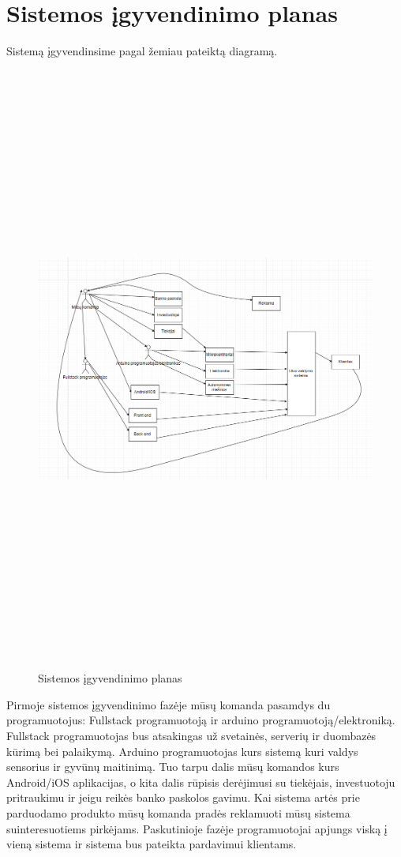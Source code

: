 \documentclass[oneside]{VUMIFPSkursinis}
\begin{document}
\section{Sistemos įgyvendinimo planas}
Sistemą įgyvendinsime pagal žemiau pateiktą diagramą. 
\begin{figure}[H]
		\centering	
	\includegraphics[width=18cm,height=20cm,keepaspectratio]{SistemosIgyvendinimas.png}
	\caption{Sistemos įgyvendinimo planas}
	\label{fig:Sistemos įgyvendinimo planas}
\end{figure}

Pirmoje sistemos įgyvendinimo fazėje mūsų komanda pasamdys du programuotojus: Fullstack programuotoją ir arduino programuotoją/elektroniką. Fullstack programuotojas bus atsakingas už svetainės, serverių ir duombazės kūrimą bei palaikymą. Arduino programuotojas kurs sistemą kuri valdys sensorius ir gyvūnų maitinimą. Tuo tarpu dalis mūsų komandos kurs Android/iOS aplikacijas, o kita dalis rūpisis derėjimusi su tiekėjais, investuotoju pritraukimu ir jeigu reikės banko paskolos gavimu. Kai sistema artės prie parduodamo produkto mūsų komanda pradės reklamuoti mūsų sistema suinteresuotiems pirkėjams. Paskutinioje fazėje programuotojai apjungs viską į vieną sistema ir sistema bus pateikta pardavimui klientams. 
\end{document}
